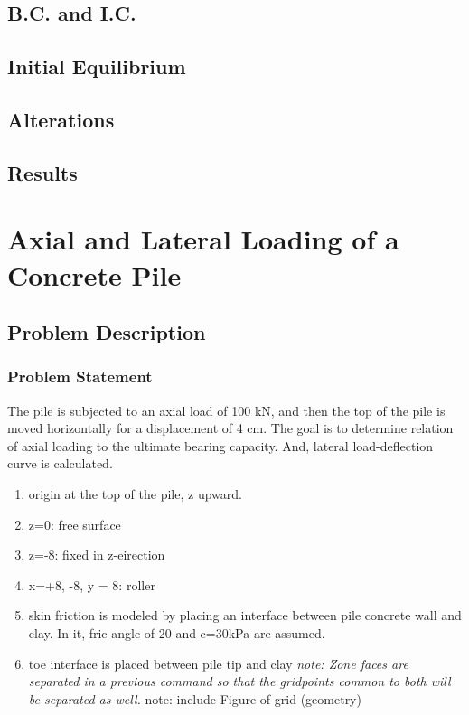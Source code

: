 \documentclass[a4paper, nobind]{templates/ociamthesis}
\providecommand{\tightlist}{%
  \setlength{\itemsep}{0pt}\setlength{\parskip}{0pt}}
\begin{document}
\hypertarget{b.c.-and-i.c.}{%
\section{B.C. and I.C.}\label{b.c.-and-i.c.}}

\hypertarget{initial-equilibrium}{%
\section{Initial Equilibrium}\label{initial-equilibrium}}

\hypertarget{alterations}{%
\section{Alterations}\label{alterations}}

\hypertarget{results}{%
\section{Results}\label{results}}

\newpage

\hypertarget{axial-and-lateral-loading-of-a-concrete-pile}{%
\chapter{Axial and Lateral Loading of a Concrete Pile}\label{axial-and-lateral-loading-of-a-concrete-pile}}

\hypertarget{problem-description}{%
\section{Problem Description}\label{problem-description}}

\hypertarget{problem-statement}{%
\subsection{Problem Statement}\label{problem-statement}}

The pile is subjected to an axial load of 100 kN,
and then the top of the pile is moved horizontally for a displacement of 4 cm.
The goal is to determine relation of axial loading to the ultimate bearing capacity.
And, lateral load-deflection curve is calculated.

\begin{enumerate}
\def\labelenumi{\arabic{enumi})}
\tightlist
\item
  origin at the top of the pile, z upward.
\item
  z=0: free surface
\item
  z=-8: fixed in z-eirection
\item
  x=+8, -8, y = 8: roller
\item
  skin friction is modeled by placing an interface
  between pile concrete wall and clay.
  In it, fric angle of 20 and c=30kPa are assumed.
\item
  toe interface is placed between pile tip and clay
  \emph{note: Zone faces are separated in a previous command so that the gridpoints common to both will be separated as well.
  }note: include Figure of grid (geometry)
\end{enumerate}
\end{document}
